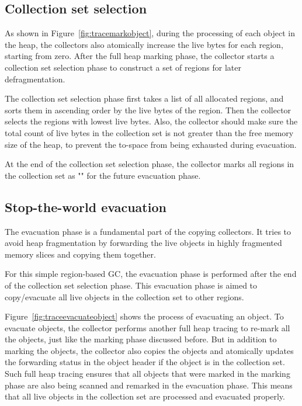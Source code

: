 \subsection{Collection set selection}

As shown in Figure~\ref{fig:tracemarkobject}, during the processing of each object in the heap,
the collectors also atomically increase the live bytes for each region, starting from zero.
After the full heap marking phase, the collector starts a collection set selection phase to construct
a set of regions for later defragmentation.

The collection set selection phase first takes a list of all allocated regions,
and sorts them in ascending order by the live bytes of the region.
Then the collector selects the regions with lowest live bytes.
Also, the collector should make sure the total count of live bytes in the collection set is not
greater than the free memory size of the heap, to prevent the to-space from being exhausted during evacuation.

At the end of the collection set selection phase, the collector marks all regions
in the collection set as "" for the future evacuation phase.

\subsection{Stop-the-world evacuation}

The evacuation phase is a fundamental part of the copying collectors.
It tries to avoid heap fragmentation by forwarding the live objects in highly fragmented memory slices
and copying them together.

For this simple region-based GC, the evacuation phase is performed after the end of the collection set selection phase.
This evacuation phase is aimed to copy/evacuate all live objects in the collection set to other
regions.

Figure~\ref{fig:traceevacuateobject} shows the process of evacuating an object.
To evacuate objects, the collector performs another full heap tracing to re-mark all the objects,
just like the marking phase discussed before.
But in addition to marking the objects, the collector also copies the objects and atomically updates the forwarding status in the object header
if the object is in the collection set.
Such full heap tracing ensures that all objects that were marked in the marking phase are also being scanned and remarked in the evacuation phase.
This means that all live objects in the collection set are processed and evacuated properly.

